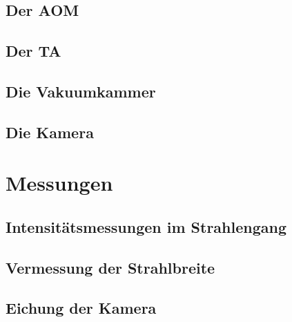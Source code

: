 \documentclass[12pt,a4paper]{article}
\begin{document}
  \subsection{Der AOM}
    
  \subsection{Der TA}
  \subsection{Die Vakuumkammer}
  \subsection{Die Kamera}
\section{Messungen}
  \subsection{Intensitätsmessungen im Strahlengang}
  \subsection{Vermessung der Strahlbreite}
  \subsection{Eichung der Kamera}
\end{document}
